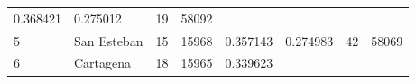 \documentclass[]{article}
\begin{document}
\begin{longtable}[]{@{}llllllll@{}}
\begin{minipage}[t]{0.10\columnwidth}
0.368421\strut
\end{minipage} & \begin{minipage}[t]{0.09\columnwidth}\raggedright
0.275012\strut
\end{minipage} & \begin{minipage}[t]{0.11\columnwidth}\raggedright
19\strut
\end{minipage} & \begin{minipage}[t]{0.10\columnwidth}\raggedright
58092\strut
\end{minipage}\tabularnewline
\begin{minipage}[t]{0.03\columnwidth}\raggedright
5\strut
\end{minipage} & \begin{minipage}[t]{0.09\columnwidth}\raggedright
San Esteban\strut
\end{minipage} & \begin{minipage}[t]{0.14\columnwidth}\raggedright
15\strut
\end{minipage} & \begin{minipage}[t]{0.13\columnwidth}\raggedright
15968\strut
\end{minipage} & \begin{minipage}[t]{0.10\columnwidth}\raggedright
0.357143\strut
\end{minipage} & \begin{minipage}[t]{0.09\columnwidth}\raggedright
0.274983\strut
\end{minipage} & \begin{minipage}[t]{0.11\columnwidth}\raggedright
42\strut
\end{minipage} & \begin{minipage}[t]{0.10\columnwidth}\raggedright
58069\strut
\end{minipage}\tabularnewline
\begin{minipage}[t]{0.03\columnwidth}\raggedright
6\strut
\end{minipage} & \begin{minipage}[t]{0.09\columnwidth}\raggedright
Cartagena\strut
\end{minipage} & \begin{minipage}[t]{0.14\columnwidth}\raggedright
18\strut
\end{minipage} & \begin{minipage}[t]{0.13\columnwidth}\raggedright
15965\strut
\end{minipage} & \begin{minipage}[t]{0.10\columnwidth}\raggedright
0.339623\strut
\end{minipage} & \begin{minipage}[t]{0.09\columnwidth}\raggedright

\end{minipage}
\end{longtable}
\end{document}
